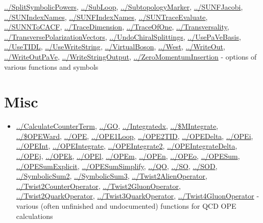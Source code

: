 \documentclass[../FeynCalcManual.tex]{subfiles}
\begin{document}
\begin{itemize}
  \hyperlink{../splitsymbolicpowers}{../SplitSymbolicPowers},
  \hyperlink{../subloop}{../SubLoop},
  \hyperlink{../subtopologymarker}{../SubtopologyMarker},
  \hyperlink{../sunfjacobi}{../SUNFJacobi},
  \hyperlink{../sunindexnames}{../SUNIndexNames},
  \hyperlink{../sunfindexnames}{../SUNFIndexNames},
  \hyperlink{../suntraceevaluate}{../SUNTraceEvaluate},
  \hyperlink{../sunntocacf}{../SUNNToCACF},
  \hyperlink{../tracedimension}{../TraceDimension},
  \hyperlink{../traceofone}{../TraceOfOne},
  \hyperlink{../transversality}{../Transversality},
  \hyperlink{../transversepolarizationvectors}{../TransversePolarizationVectors},
  \hyperlink{../undochiralsplittings}{../UndoChiralSplittings},
  \hyperlink{../usepavebasis}{../UsePaVeBasis},
  \hyperlink{../usetidl}{../UseTIDL},
  \hyperlink{../usewritestring}{../UseWriteString},
  \hyperlink{../virtualboson}{../VirtualBoson},
  \hyperlink{../west}{../West}, \hyperlink{../writeout}{../WriteOut},
  \hyperlink{../writeoutpave}{../WriteOutPaVe},
  \hyperlink{../writestringoutput}{../WriteStringOutput},
  \hyperlink{../zeromomentuminsertion}{../ZeroMomentumInsertion} -
  options of various functions and symbols
\end{itemize}

\hypertarget{misc}{
\section{Misc}\label{misc}}

\begin{itemize}
\tightlist
\item
  \hyperlink{../calculatecounterterm}{../CalculateCounterTerm},
  \hyperlink{../go}{../GO}, \hyperlink{../integratedx}{../Integratedx},
  \hyperlink{../dollarmintegrate}{../\$MIntegrate},
  \hyperlink{../dollaropeward}{../\$OPEWard},
  \hyperlink{../ope}{../OPE}, \hyperlink{../ope1loop}{../OPE1Loop},
  \hyperlink{../ope2tid}{../OPE2TID},
  \hyperlink{../opedelta}{../OPEDelta}, \hyperlink{../opei}{../OPEi},
  \hyperlink{../opeint}{../OPEInt},
  \hyperlink{../opeintegrate}{../OPEIntegrate},
  \hyperlink{../opeintegrate2}{../OPEIntegrate2},
  \hyperlink{../opeintegratedelta}{../OPEIntegrateDelta},
  \hyperlink{../opej}{../OPEj}, \hyperlink{../opek}{../OPEk},
  \hyperlink{../opel}{../OPEl}, \hyperlink{../opem}{../OPEm},
  \hyperlink{../open}{../OPEn}, \hyperlink{../opeo}{../OPEo},
  \hyperlink{../opesum}{../OPESum},
  \hyperlink{../opesumexplicit}{../OPESumExplicit},
  \hyperlink{../opesumsimplify}{../OPESumSimplify},
  \hyperlink{../qo}{../QO}, \hyperlink{../so}{../SO},
  \hyperlink{../sod}{../SOD},
  \hyperlink{../symbolicsum2}{../SymbolicSum2},
  \hyperlink{../symbolicsum3}{../SymbolicSum3},
  \hyperlink{../twist2alienoperator}{../Twist2AlienOperator},
  \hyperlink{../twist2counteroperator}{../Twist2CounterOperator},
  \hyperlink{../twist2gluonoperator}{../Twist2GluonOperator},
  \hyperlink{../twist2quarkoperator}{../Twist2QuarkOperator},
  \hyperlink{../twist3quarkoperator}{../Twist3QuarkOperator},
  \hyperlink{../twist4gluonoperator}{../Twist4GluonOperator} - various
  (often unfinished and undocumented) functions for QCD OPE calculations
\end{itemize}
\end{document}
